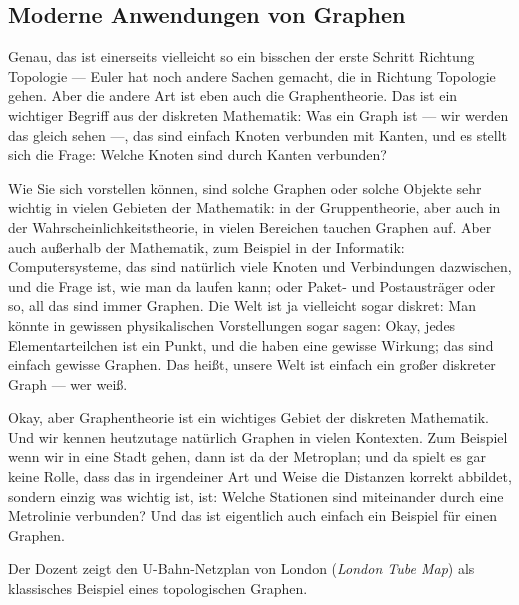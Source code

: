 \subsection{Moderne Anwendungen von Graphen}

\begin{spoken-clean}[00:09:33 - 00:11:42]
Genau, das ist einerseits vielleicht so ein bisschen der erste Schritt Richtung Topologie --- Euler hat noch andere Sachen gemacht, die in Richtung Topologie gehen. Aber die andere Art ist eben auch die Graphentheorie. Das ist ein wichtiger Begriff aus der diskreten Mathematik: Was ein Graph ist --- wir werden das gleich sehen ---, das sind einfach Knoten verbunden mit Kanten, und es stellt sich die Frage: Welche Knoten sind durch Kanten verbunden?

Wie Sie sich vorstellen können, sind solche Graphen oder solche Objekte sehr wichtig in vielen Gebieten der Mathematik: in der Gruppentheorie, aber auch in der Wahrscheinlichkeitstheorie, in vielen Bereichen tauchen Graphen auf. Aber auch außerhalb der Mathematik, zum Beispiel in der Informatik: Computersysteme, das sind natürlich viele Knoten und Verbindungen dazwischen, und die Frage ist, wie man da laufen kann; oder Paket- und Postausträger oder so, all das sind immer Graphen. Die Welt ist ja vielleicht sogar diskret: Man könnte in gewissen physikalischen Vorstellungen sogar sagen: Okay, jedes Elementarteilchen ist ein Punkt, und die haben eine gewisse Wirkung; das sind einfach gewisse Graphen. Das heißt, unsere Welt ist einfach ein großer diskreter Graph --- wer weiß.

Okay, aber Graphentheorie ist ein wichtiges Gebiet der diskreten Mathematik. Und wir kennen heutzutage natürlich Graphen in vielen Kontexten. Zum Beispiel wenn wir in eine Stadt gehen, dann ist da der Metroplan; und da spielt es gar keine Rolle, dass das in irgendeiner Art und Weise die Distanzen korrekt abbildet, sondern einzig was wichtig ist, ist: Welche Stationen sind miteinander durch eine Metrolinie verbunden? Und das ist eigentlich auch einfach ein Beispiel für einen Graphen.
\end{spoken-clean}

\begin{meta-note}
Der Dozent zeigt den U-Bahn-Netzplan von London (\emph{London Tube Map}) als klassisches Beispiel eines topologischen Graphen.
\end{meta-note}

